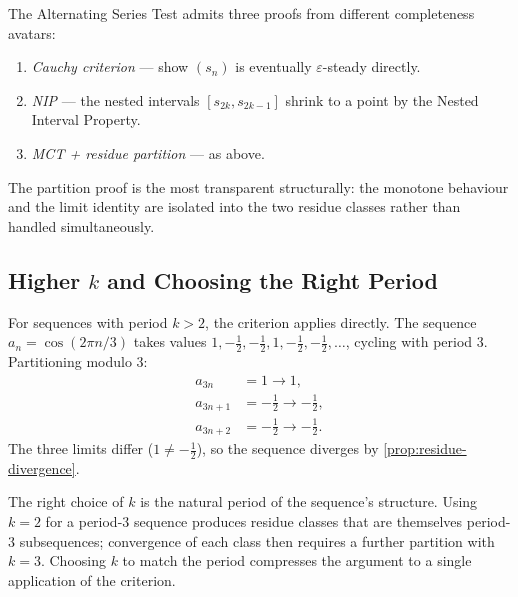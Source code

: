 

\begin{remark}
The Alternating Series Test admits three proofs from different
completeness avatars:
\begin{enumerate}
  \item \emph{Cauchy criterion} --- show $(s_n)$ is eventually
        $\varepsilon$-steady directly.
  \item \emph{NIP} --- the nested intervals $[s_{2k}, s_{2k-1}]$ shrink
        to a point by the Nested Interval Property.
  \item \emph{MCT + residue partition} --- as above.
\end{enumerate}
The partition proof is the most transparent structurally: the monotone
behaviour and the limit identity are isolated into the two residue classes
rather than handled simultaneously.
\end{remark}

\subsection*{\texorpdfstring{Higher $k$ and Choosing the Right Period}{Higher k and Choosing the Right Period}}
\label{subsec:higher-k}

For sequences with period $k > 2$, the criterion applies directly. The
sequence $a_n = \cos(2\pi n / 3)$ takes values $1, -\tfrac{1}{2},
-\tfrac{1}{2}, 1, -\tfrac{1}{2}, -\tfrac{1}{2}, \ldots$, cycling with
period $3$. Partitioning modulo $3$:
\begin{align*}
  a_{3n}   &= 1 \to 1, \\
  a_{3n+1} &= -\tfrac{1}{2} \to -\tfrac{1}{2}, \\
  a_{3n+2} &= -\tfrac{1}{2} \to -\tfrac{1}{2}.
\end{align*}
The three limits differ ($1 \neq -\tfrac{1}{2}$), so the sequence diverges
by \cref{prop:residue-divergence}.

\begin{remark}
The right choice of $k$ is the natural period of the sequence's structure.
Using $k = 2$ for a period-$3$ sequence produces residue classes that are
themselves period-$3$ subsequences; convergence of each class then requires
a further partition with $k = 3$. Choosing $k$ to match the period compresses
the argument to a single application of the criterion.
\end{remark}

